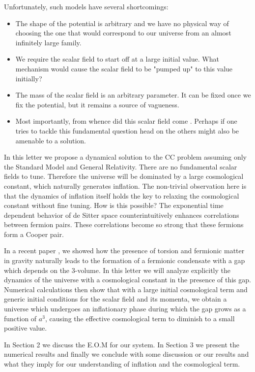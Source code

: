 \begin{doublespace}
Unfortunately, such models have several shortcomings:
\begin{itemize}
  \item The shape of the potential is arbitrary and we have no physical way of choosing
  the one that would correspond to our universe from an almost
  infinitely large family.
  \item We require the scalar field to start off at a large initial
  value. What mechanism would cause the scalar field to be "pumped
  up" to this value initially?
  \item The mass of the scalar field is an arbitrary parameter. It
  can be fixed once we fix the potential, but it remains a source of
  vagueness.
  \item Most importantly, from whence did this scalar field come
  . Perhaps if one tries to tackle this fundamental question head
  on the others might also be amenable to a solution.
\end{itemize}

In this letter we propose a dynamical solution to the CC problem
assuming only the Standard Model and General Relativity.  There are
no fundamental scalar fields to tune.  Therefore the universe will
be dominated by a large cosmological constant, which naturally
generates inflation.  The non-trivial observation here is that the
dynamics of inflation itself holds the key to relaxing the
cosmological constant without fine tuning. How is this possible? The
exponential time dependent behavior of de Sitter space
counterintuitively enhances correlations between fermion pairs.
These correlations become so strong that these fermions form a
Cooper pair.

In a recent paper \cite{Alexander2006Gravity}, we showed how the presence
of torsion and fermionic matter in gravity naturally leads to the
formation of a fermionic condensate with a gap which depends on the
3-volume.  In this letter we will analyze explicitly the dynamics of
the universe with a cosmological constant in the presence of this
gap. Numerical calculations then show that with a large initial
cosmological term and generic initial conditions for the scalar
field and its momenta, we obtain a universe which undergoes an
inflationary phase during which the gap grows as a function of
$a^3$, causing the effective cosmological term to diminish to a
small positive value.

In Section 2 we discuss the E.O.M for our system. In Section 3 we
present the numerical results and finally we conclude with some
discussion or our results and what they imply for our understanding
of inflation and the cosmological term.


\end{doublespace}
